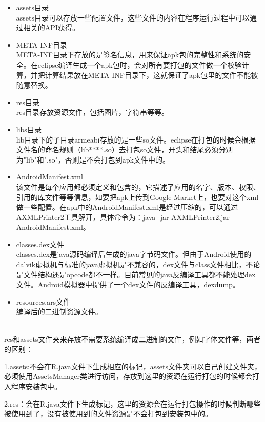 \begin{itemize}
\item assets目录\\
assets目录可以存放一些配置文件，这些文件的内容在程序运行过程中可以通过相关的API获得。

\item META-INF目录\\
META-INF目录下存放的是签名信息，用来保证apk包的完整性和系统的安全。在eclipse编译生成一个apk包时，会对所有要打包的文件做一个校验计算，并把计算结果放在META-INF目录下，这就保证了apk包里的文件不能被随意替换。

\item res目录\\
res目录存放资源文件，包括图片，字符串等等。

\item libs目录\\
lib目录下的子目录armeabi存放的是一些so文件。eclipse在打包的时候会根据文件名的命名规则（lib****.so）去打包so文件，开头和结尾必须分别为"lib"和".so"，否则是不会打包到apk文件中的。

\item AndroidManifest.xml\\
该文件是每个应用都必须定义和包含的，它描述了应用的名字、版本、权限、引用的库文件等等信息，如要把apk上传到Google Market上，也要对这个xml做一些配置。在apk中的AndroidManifest.xml是经过压缩的，可以通过AXMLPrinter2工具解开，具体命令为：java -jar AXMLPrinter2.jar AndroidManifest.xml。

\item classes.dex文件\\
 classes.dex是java源码编译后生成的java字节码文件。但由于Android使用的dalvik虚拟机与标准的java虚拟机是不兼容的，dex文件与class文件相比，不论是文件结构还是opcode都不一样。目前常见的java反编译工具都不能处理dex文件。Android模拟器中提供了一个dex文件的反编译工具，dexdump。

\item resources.ars文件\\
编译后的二进制资源文件。
\end{itemize}

\\
res和assets文件夹来存放不需要系统编译成二进制的文件，例如字体文件等，两者的区别：

1.assets:不会在R.java文件下生成相应的标记，assets文件夹可以自己创建文件夹，必须使用AssetsManager类进行访问，存放到这里的资源在运行打包的时候都会打入程序安装包中。

2.res：会在R.java文件下生成标记，这里的资源会在运行打包操作的时候判断哪些被使用到了，没有被使用到的文件资源是不会打包到安装包中的。




